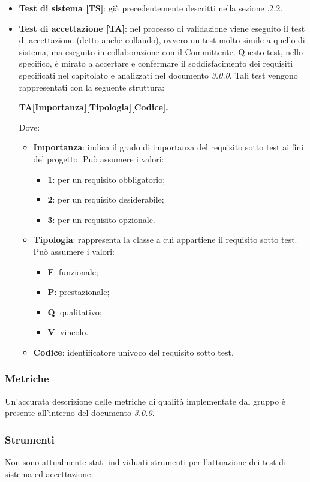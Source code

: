       \begin{itemize}
      \item \textbf{Test di sistema [TS]}: già precedentemente descritti nella sezione .2.2.
      \item \textbf{Test di accettazione [TA]}: nel processo di validazione viene eseguito il test di accettazione (detto anche collaudo), ovvero un test molto simile a quello di sistema, ma eseguito in collaborazione con il Committente. Questo test, nello specifico, è mirato a accertare e confermare il soddisfacimento dei requisiti specificati nel capitolato e analizzati nel documento \AdR{}\textit{3.0.0}. Tali test vengono rappresentati con la seguente struttura: \\
      \begin{center}
      	\textbf{TA[Importanza][Tipologia][Codice].}
      \end{center}     
      Dove:
      \begin{itemize}
      	\item{\textbf{Importanza}: indica il grado di importanza del requisito sotto test ai fini del progetto. Può assumere i valori:}
      	\begin{itemize}
      		\item{\textbf{1}: per un requisito obbligatorio;}
      		\item{\textbf{2}: per un requisito desiderabile;}
      		\item{\textbf{3}: per un requisito opzionale.}
      	\end{itemize}
      	
      	\item{\textbf{Tipologia}: rappresenta la classe a cui appartiene il requisito sotto test. Può assumere i valori:}
      	\begin{itemize}
      		\item{\textbf{F}: funzionale;}
      		\item{\textbf{P}: prestazionale;}
      		\item{\textbf{Q}: qualitativo;}
      		\item{\textbf{V}: vincolo.}
      	\end{itemize}
      	
      	\item{\textbf{Codice}: identificatore univoco del requisito sotto test}.
      \end{itemize}
 	\end{itemize}
    \subsubsection{Metriche}
    Un'accurata descrizione delle metriche di qualità implementate dal gruppo è presente all'interno del documento \PdQ{} \textit{3.0.0}.
    \subsubsection{Strumenti}
    Non sono attualmente stati individuati strumenti per l'attuazione dei test di sistema ed accettazione.
